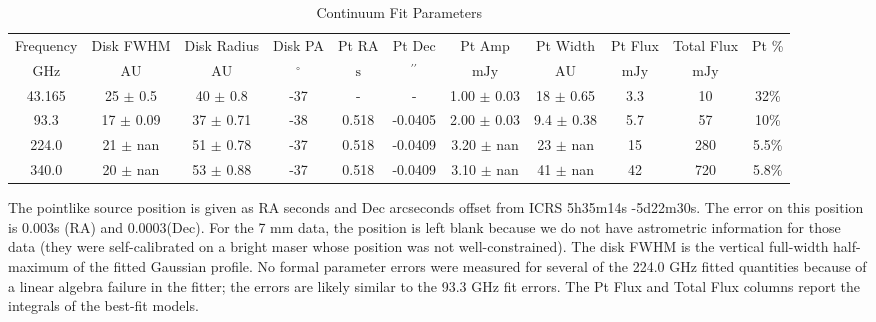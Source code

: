 \begin{table*}[htp]
\centering
\caption{Continuum Fit Parameters}
\begin{tabular}{ccccccccccc}
\label{tab:continuum_fit_parameters}
Frequency & Disk FWHM & Disk Radius & Disk PA & Pt RA & Pt Dec & Pt Amp & Pt Width & Pt Flux & Total Flux & Pt \% \\
$\mathrm{GHz}$ & $\mathrm{AU}$ & $\mathrm{AU}$ & $\mathrm{{}^{\circ}}$ & $\mathrm{s}$ & $\mathrm{{}^{\prime\prime}}$ & $\mathrm{mJy}$ & $\mathrm{AU}$ & $\mathrm{mJy}$ & $\mathrm{mJy}$ & $\mathrm{}$ \\
\hline
43.165 & 25 $\pm$ 0.5 & 40 $\pm$ 0.8 & -37 & - & - & 1.00 $\pm$ 0.03 & 18 $\pm$ 0.65 & 3.3 & 10 & 32\% \\
93.3 & 17 $\pm$ 0.09 & 37 $\pm$ 0.71 & -38 & 0.518 & -0.0405 & 2.00 $\pm$ 0.03 & 9.4 $\pm$ 0.38 & 5.7 & 57 & 10\% \\
224.0 & 21 $\pm$ nan & 51 $\pm$ 0.78 & -37 & 0.518 & -0.0409 & 3.20 $\pm$ nan & 23 $\pm$ nan & 15 & 280 & 5.5\% \\
340.0 & 20 $\pm$ nan & 53 $\pm$ 0.88 & -37 & 0.518 & -0.0409 & 3.10 $\pm$ nan & 41 $\pm$ nan & 42 & 720 & 5.8\% \\
\hline
\end{tabular}

\par The pointlike source position is given as RA seconds and Dec arcseconds offset from ICRS 5h35m14s -5d22m30s.  The error on this position is 0.003s (RA) and 0.0003\arcsec (Dec). For the 7 mm data, the position is left blank because we do not have astrometric information for those data (they were self-calibrated on a bright maser whose position was not well-constrained).  The disk FWHM is the vertical full-width half-maximum of the fitted Gaussian profile.  No formal parameter errors were measured for several of the 224.0 GHz fitted quantities because of a linear algebra failure in the fitter; the errors are likely similar to the 93.3 GHz fit errors. The Pt Flux and Total Flux columns report the integrals of the best-fit models.
\end{table*}
